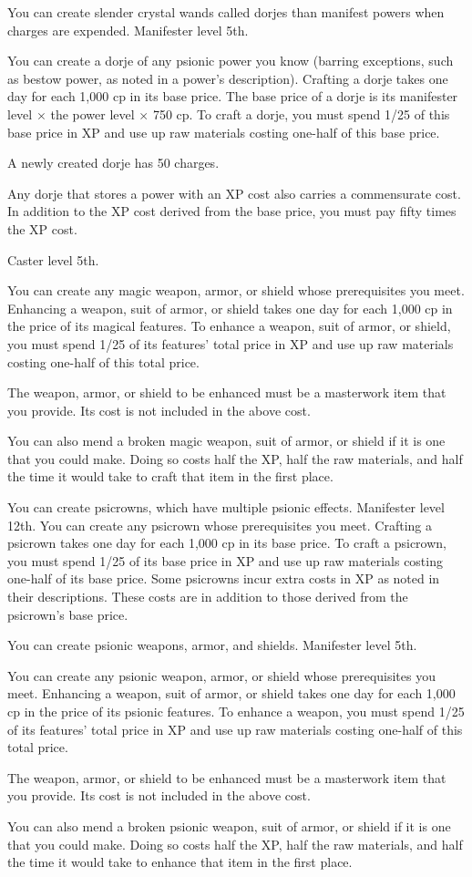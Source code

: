 {You can create slender crystal wands called dorjes than manifest powers when charges are expended.}
{Manifester level 5th.}
{You can create a dorje of any psionic power you know (barring exceptions, such as bestow power, as noted in a power's description). Crafting a dorje takes one day for each 1,000 cp in its base price. The base price of a dorje is its manifester level $\times$ the power level $\times$ 750 cp. To craft a dorje, you must spend 1/25 of this base price in XP and use up raw materials costing one-half of this base price.

A newly created dorje has 50 charges.

Any dorje that stores a power with an XP cost also carries a commensurate cost. In addition to the XP cost derived from the base price, you must pay fifty times the XP cost.}{}{}

{Caster level 5th.}
{You can create any magic weapon, armor, or shield whose prerequisites you meet. Enhancing a weapon, suit of armor, or shield takes one day for each 1,000 cp in the price of its magical features. To enhance a weapon, suit of armor, or shield, you must spend 1/25 of its features' total price in XP and use up raw materials costing one-half of this total price.

The weapon, armor, or shield to be enhanced must be a masterwork item that you provide. Its cost is not included in the above cost.

You can also mend a broken magic weapon, suit of armor, or shield if it is one that you could make. Doing so costs half the XP, half the raw materials, and half the time it would take to craft that item in the first place.}

{You can create psicrowns, which have multiple psionic effects.}
{Manifester level 12th.}
{You can create any psicrown whose prerequisites you meet. Crafting a psicrown takes one day for each 1,000 cp in its base price. To craft a psicrown, you must spend 1/25 of its base price in XP and use up raw materials costing one-half of its base price. Some psicrowns incur extra costs in XP as noted in their descriptions. These costs are in addition to those derived from the psicrown's base price.}{}{}

{You can create psionic weapons, armor, and shields.}
{Manifester level 5th.}
{You can create any psionic weapon, armor, or shield whose prerequisites you meet. Enhancing a weapon, suit of armor, or shield takes one day for each 1,000 cp in the price of its psionic features. To enhance a weapon, you must spend 1/25 of its features' total price in XP and use up raw materials costing one-half of this total price.

The weapon, armor, or shield to be enhanced must be a masterwork item that you provide. Its cost is not included in the above cost.

You can also mend a broken psionic weapon, suit of armor, or shield if it is one that you could make. Doing so costs half the XP, half the raw materials, and half the time it would take to enhance that item in the first place.}{}{}

